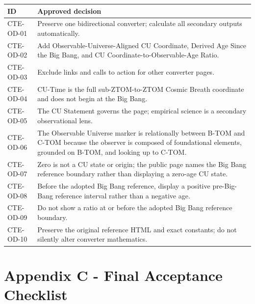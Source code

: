 \documentclass[11pt,letterpaper]{article}
\begin{document}
\begin{longtable}{L{0.9in}L{5.35in}}
\toprule
\textbf{ID} & \textbf{Approved decision} \\
\midrule
CTE-OD-01 & Preserve one bidirectional converter; calculate all secondary outputs automatically. \\
CTE-OD-02 & Add Observable-Universe-Aligned CU Coordinate, Derived Age Since the Big Bang, and CU Coordinate-to-Observable-Age Ratio. \\
CTE-OD-03 & Exclude links and calls to action for other converter pages. \\
CTE-OD-04 & CU-Time is the full sub-ZTOM-to-ZTOM Cosmic Breath coordinate and does not begin at the Big Bang. \\
CTE-OD-05 & The CU Statement governs the page; empirical science is a secondary observational lens. \\
CTE-OD-06 & The Observable Universe marker is relationally between B-TOM and C-TOM because the observer is composed of foundational elements, grounded on B-TOM, and looking up to C-TOM. \\
CTE-OD-07 & Zero is not a CU state or origin; the public page names the Big Bang reference boundary rather than displaying a zero-age CU state. \\
CTE-OD-08 & Before the adopted Big Bang reference, display a positive pre-Big-Bang reference interval rather than a negative age. \\
CTE-OD-09 & Do not show a ratio at or before the adopted Big Bang reference boundary. \\
CTE-OD-10 & Preserve the original reference HTML and exact constants; do not silently alter converter mathematics. \\
\bottomrule
\end{longtable}

\section{Appendix C - Final Acceptance Checklist}
\end{document}

